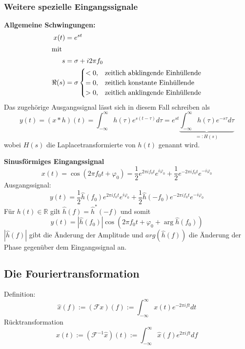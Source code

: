 \subsubsection{Weitere spezielle Eingangssignale}
\textbf{Allgemeine Schwingungen:}
\begin{align*}
    x(t)   & =e^{st}             \\
    \intertext{mit}
    s      & =\sigma + i2\pi f_0 \\
    \Re(s) & = \sigma
    \begin{cases}
        <0, & \text{zeitlich abklingende Einhüllende} \\
        =0, & \text{zeitlich konstante Einhüllende}   \\
        >0, & \text{zeitlich anklingende Einhüllende}
    \end{cases}
\end{align*}
Das zugehörige Ausgangssignal lässt sich in diesem Fall schreiben als
\begin{equation*}
    y(t)=(x*h)(t)=\int_{-\infty}^\infty h(\tau)e^{s(t-\tau)}d\tau=e^{st}\underbrace{\int_{-\infty}^\infty h(\tau)e^{-s\tau}d\tau}_{=:H(s)}
\end{equation*}
wobei $H(s)$ die Laplacetransformierte von $h(t)$ genannt wird.

\bigskip

\textbf{Sinusförmiges Eingangssignal}
\begin{equation*}
    x(t)=\cos(2\pi f_0t+\varphi_0)=\frac{1}{2}e^{2\pi if_0t}e^{i\varphi_0}+\frac{1}{2}e^{-2\pi if_0t}e^{-i\varphi_0}
\end{equation*}
Ausgangssignal:
\begin{equation*}
    y(t)=\frac12\hat{h}(f_0)e^{2\pi if_0t}e^{i\varphi_0}+\frac12\hat{h}(-f_0)e^{-2\pi if_0t}e^{-i\varphi_0}
\end{equation*}
Für $h(t)\in\mathbb{R}$ gilt $\hat{h}(f)=\hat{h}^*(-f)$ und somit
\begin{equation*}
    y(t) = |\hat{h}(f_0)|\cos(2\pi f_0t+\varphi_0+\arg\hat{h}(f_0))
\end{equation*}
$|\hat{h}(f)|$ gibt die Änderung der Amplitude und $arg(\hat{h}(f))$ die Änderung der Phase gegenüber
dem Eingangssignal an.

\subsection{Die Fouriertransformation}
Definition:
\begin{equation*}
    \hat{x}(f):=(\mathcal{F}x)(f):=\int_{-\infty}^\infty x(t)e^{-2\pi ift}dt
\end{equation*}
Rücktransformation
\begin{equation*}
    x(t):=(\mathcal{F}^{-1}\hat{x})(t):=\int_{-\infty}^\infty\hat{x}(f)e^{2\pi ift}df
\end{equation*}

